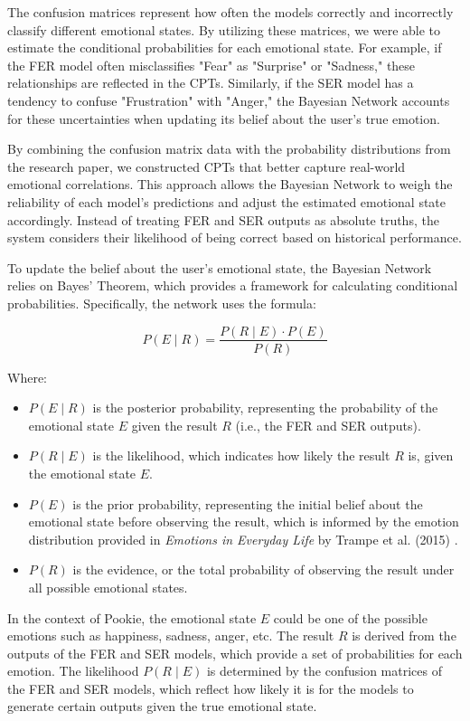 The confusion matrices represent how often the models correctly and incorrectly classify different emotional states. By utilizing these matrices, we were able to estimate the conditional probabilities for each emotional state. For example, if the FER model often misclassifies "Fear" as "Surprise" or "Sadness," these relationships are reflected in the CPTs. Similarly, if the SER model has a tendency to confuse "Frustration" with "Anger," the Bayesian Network accounts for these uncertainties when updating its belief about the user’s true emotion.

By combining the confusion matrix data with the probability distributions from the research paper, we constructed CPTs that better capture real-world emotional correlations. This approach allows the Bayesian Network to weigh the reliability of each model's predictions and adjust the estimated emotional state accordingly. Instead of treating FER and SER outputs as absolute truths, the system considers their likelihood of being correct based on historical performance.

To update the belief about the user’s emotional state, the Bayesian Network relies on Bayes’ Theorem, which provides a framework for calculating conditional probabilities. Specifically, the network uses the formula:

\[
P(E \mid R) = \frac{P(R \mid E) \cdot P(E)}{P(R)}
\]

Where:
\begin{itemize}
    \item \( P(E \mid R) \) is the posterior probability, representing the probability of the emotional state \( E \) given the result \( R \) (i.e., the FER and SER outputs).
    \item \( P(R \mid E) \) is the likelihood, which indicates how likely the result \( R \) is, given the emotional state \( E \).
    \item \( P(E) \) is the prior probability, representing the initial belief about the emotional state before observing the result, which is informed by the emotion distribution provided in \textit{Emotions in Everyday Life} by Trampe et al. (2015) \cite{10.1371/journal.pone.0145450}.
    \item \( P(R) \) is the evidence, or the total probability of observing the result under all possible emotional states.
\end{itemize}

In the context of Pookie, the emotional state \( E \) could be one of the possible emotions such as happiness, sadness, anger, etc. The result \( R \) is derived from the outputs of the FER and SER models, which provide a set of probabilities for each emotion. The likelihood \( P(R \mid E) \) is determined by the confusion matrices of the FER and SER models, which reflect how likely it is for the models to generate certain outputs given the true emotional state.


